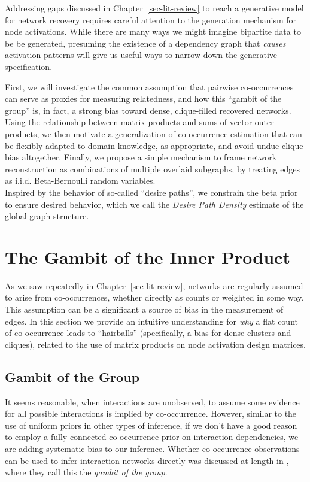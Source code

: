 \documentclass[%
	12pt,
		oneside,
		letterpaper
]{book}
\begin{document}
Addressing gaps discussed in Chapter~\ref{sec-lit-review} to reach a
generative model for network recovery requires careful attention to the
generation mechanism for node activations. While there are many ways we
might imagine bipartite data to be be generated, presuming the existence
of a dependency graph that \emph{causes} activation patterns will give
us useful ways to narrow down the generative specification.

First, we will investigate the common assumption that pairwise
co-occurrences can serve as proxies for measuring relatedness, and how
this ``gambit of the group'' is, in fact, a strong bias toward dense,
clique-filled recovered networks. Using the relationship between matrix
products and sums of vector outer-products, we then motivate a
generalization of co-occurrence estimation that can be flexibly adapted
to domain knowledge, as appropriate, and avoid undue clique bias
altogether. Finally, we propose a simple mechanism to frame network
reconstruction as combinations of multiple overlaid subgraphs, by
treating edges as i.i.d. Beta-Bernoulli random variables.\\
Inspired by the behavior of so-called ``desire paths'', we constrain the
beta prior to ensure desired behavior, which we call the \emph{Desire
Path Density} estimate of the global graph structure.

\section{The Gambit of the Inner Product}\label{sec-clique-bias}

As we saw repeatedly in Chapter~\ref{sec-lit-review}, networks are
regularly assumed to arise from co-occurrences, whether directly as
counts or weighted in some way. This assumption can be a significant a
source of bias in the measurement of edges. In this section we provide
an intuitive understanding for \emph{why} a flat count of co-occurrence
leads to ``hairballs'' (specifically, a bias for dense clusters and
cliques), related to the use of matrix products on node activation
design matrices.

\subsection{Gambit of the Group}\label{gambit-of-the-group}

It seems reasonable, when interactions are unobserved, to assume some
evidence for all possible interactions is implied by co-occurrence.
However, similar to the use of uniform priors in other types of
inference, if we don't have a good reason to employ a fully-connected
co-occurrence prior on interaction dependencies, we are adding
systematic bias to our inference. Whether co-occurrence observations can
be used to infer interaction networks directly was discussed at length
in \textcite{Techniquesanalyzingvertebrate_Whitehead1999}, where they
call this the \emph{gambit of the group}.
\end{document}
